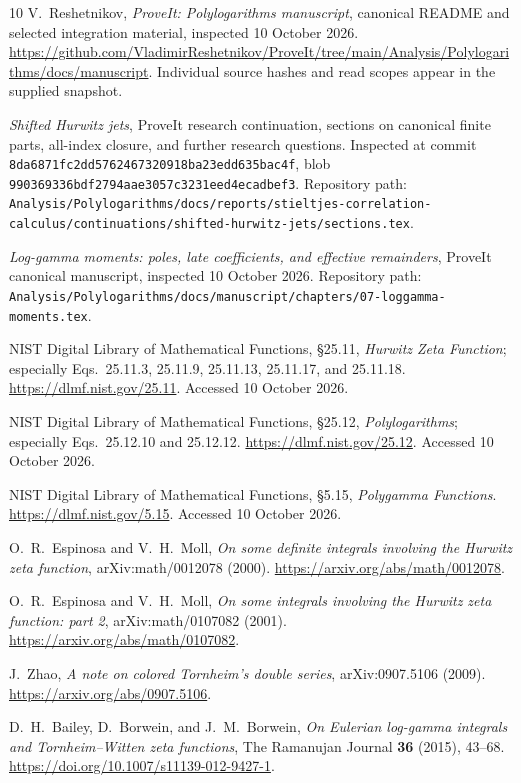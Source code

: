 \documentclass[11pt]{article}
\numberwithin{equation}{section}
\theoremstyle{definition}\newtheorem{definition}[theorem]{Definition}
\theoremstyle{remark}\newtheorem{remark}[theorem]{Remark}
\newcommand{\src}[1]{\nolinkurl{#1}}
\begin{document}
\begin{thebibliography}{10}
V.~Reshetnikov, \emph{ProveIt: Polylogarithms manuscript}, canonical README
and selected integration material, inspected 10 October 2026.
\url{https://github.com/VladimirReshetnikov/ProveIt/tree/main/Analysis/Polylogarithms/docs/manuscript}.
Individual source hashes and read scopes appear in the supplied snapshot.

\emph{Shifted Hurwitz jets}, ProveIt research continuation, sections on
canonical finite parts, all-index closure, and further research questions.
Inspected at commit \src{8da6871fc2dd5762467320918ba23edd635bac4f},
blob \src{990369336bdf2794aae3057c3231eed4ecadbef3}.
Repository path:
\src{Analysis/Polylogarithms/docs/reports/stieltjes-correlation-calculus/continuations/shifted-hurwitz-jets/sections.tex}.

\emph{Log-gamma moments: poles, late coefficients, and effective remainders},
ProveIt canonical manuscript, inspected 10 October 2026.
Repository path:
\src{Analysis/Polylogarithms/docs/manuscript/chapters/07-loggamma-moments.tex}.

NIST Digital Library of Mathematical Functions,
\S25.11, \emph{Hurwitz Zeta Function}; especially Eqs.~25.11.3,
25.11.9, 25.11.13, 25.11.17, and 25.11.18.
\url{https://dlmf.nist.gov/25.11}. Accessed 10 October 2026.

NIST Digital Library of Mathematical Functions,
\S25.12, \emph{Polylogarithms}; especially Eqs.~25.12.10 and 25.12.12.
\url{https://dlmf.nist.gov/25.12}. Accessed 10 October 2026.

NIST Digital Library of Mathematical Functions,
\S5.15, \emph{Polygamma Functions}.
\url{https://dlmf.nist.gov/5.15}. Accessed 10 October 2026.

O.~R.~Espinosa and V.~H.~Moll,
\emph{On some definite integrals involving the Hurwitz zeta function},
arXiv:math/0012078 (2000).
\url{https://arxiv.org/abs/math/0012078}.

O.~R.~Espinosa and V.~H.~Moll,
\emph{On some integrals involving the Hurwitz zeta function: part 2},
arXiv:math/0107082 (2001).
\url{https://arxiv.org/abs/math/0107082}.

J.~Zhao, \emph{A note on colored Tornheim's double series},
arXiv:0907.5106 (2009).
\url{https://arxiv.org/abs/0907.5106}.

D.~H.~Bailey, D.~Borwein, and J.~M.~Borwein,
\emph{On Eulerian log-gamma integrals and Tornheim--Witten zeta functions},
The Ramanujan Journal \textbf{36} (2015), 43--68.
\url{https://doi.org/10.1007/s11139-012-9427-1}.
\end{thebibliography}

\end{document}
